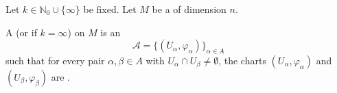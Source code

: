 
\begin{definition} \label{definition:C_k_atlas_on_a_topological_manifold}

Let $k \in \mathbb{N}_0 \cup \{\infty\}$ be fixed. Let $M$ be a  of dimension $n$. 

A  (or  if $k = \infty$) on $M$ is an 
$$ \mathcal{A} = \{(U_\alpha, \varphi_\alpha)\}_{\alpha \in A} $$
such that for every pair $\alpha, \beta \in A$ with $U_\alpha \cap U_\beta \neq \emptyset$, the charts $(U_\alpha, \varphi_\alpha)$ and $(U_\beta, \varphi_\beta)$ are .





\end{definition}

